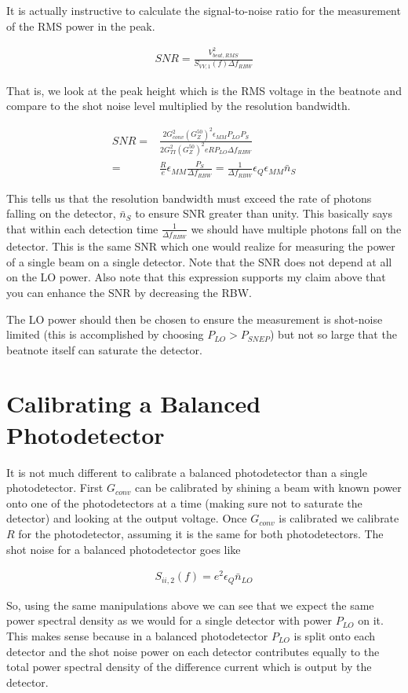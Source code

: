 \documentclass[12pt]{article}
\newcommand{\ep}{\epsilon}
\begin{document}
It is actually instructive to calculate the signal-to-noise ratio for the measurement of the RMS power in the peak.

\begin{align}
SNR = \frac{V_{beat, RMS}^2}{S_{VV,1}(f)\Delta f_{RBW}}
\end{align} 

That is, we look at the peak height which is the RMS voltage in the beatnote and compare to the shot noise level multiplied by the resolution bandwidth.

\begin{align}
SNR =& \frac{2G_{conv}^2(G_Z^{50})^2 \ep_{MM}P_{LO}P_S}{2G_{TI}^2(G_Z^{50})^2 e R P_{LO} \Delta f_{RBW}}\\
=& \frac{R}{e} \ep_{MM} \frac{P_S}{\Delta f_{RBW}} = \frac{1}{\Delta f_{RBW}}\ep_Q \ep_{MM} \bar{n}_S
\end{align}

This tells us that the resolution bandwidth must exceed the rate of photons falling on the detector, $\bar{n}_S$ to ensure SNR greater than unity. This basically says that within each detection time $\frac{1}{\Delta f_{RBW}}$ we should have multiple photons fall on the detector.
This is the same SNR which one would realize for measuring the power of a single beam on a single detector.
Note that the SNR does not depend at all on the LO power.
Also note that this expression supports my claim above that you can enhance the SNR by decreasing the RBW.

The LO power should then be chosen to ensure the measurement is shot-noise limited (this is accomplished by choosing $P_{LO} > P_{SNEP}$) but not so large that the beatnote itself can saturate the detector.

\section{Calibrating a Balanced Photodetector}

It is not much different to calibrate a balanced photodetector than a single photodetector.
First $G_{conv}$ can be calibrated by shining a beam with known power onto one of the photodetectors at a time (making sure not to saturate the detector) and looking at the output voltage.
Once $G_{conv}$ is calibrated we calibrate $R$ for the photodetector, assuming it is the same for both photodetectors.
The shot noise for a balanced photodetector goes like

\begin{align}
S_{ii,2}(f) = e^2 \ep_Q \bar{n}_{LO}
\end{align}

So, using the same manipulations above we can see that we expect the same power spectral density as we would for a single detector with power $P_{LO}$ on it.
This makes sense because in a balanced photodetector $P_{LO}$ is split onto each detector and the shot noise power on each detector contributes equally to the total power spectral density of the difference current which is output by the detector.
\end{document}
